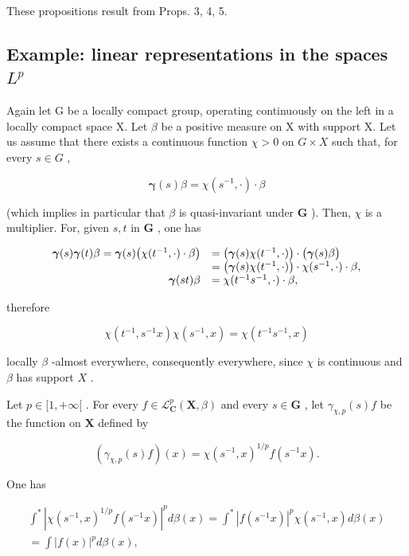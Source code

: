 These propositions result from Props. 3, 4, 5.

\subsection{\texorpdfstring{Example: linear representations in the spaces \(L^{p}\)}{Example: linear representations in the spaces L\^{}\{p\}}}

Again let G be a locally compact group, operating continuously on the left in a locally compact space X. Let \(\beta\) be a positive measure on X with support X. Let us assume that there exists a continuous function \(\chi > 0\) on \(G \times X\) such that, for every \(s \in G\) ,

\[
\boldsymbol {\gamma} (s) \beta = \chi (s ^ {- 1}, \cdot) \cdot \beta
\]

(which implies in particular that \(\beta\) is quasi-invariant under \(\mathbf{G}\) ). Then, \(\chi\) is a multiplier. For, given \(s, t\) in \(\mathbf{G}\) , one has

\[
\begin{array}{r l} \boldsymbol {\gamma} (s) \boldsymbol {\gamma} (t) \beta = \boldsymbol {\gamma} (s) \big (\chi (t ^ {- 1}, \cdot) \cdot \beta \big) & = \big (\boldsymbol {\gamma} (s) \chi (t ^ {- 1}, \cdot) \big) \cdot \big (\boldsymbol {\gamma} (s) \beta \big) \\ & = \big (\boldsymbol {\gamma} (s) \chi (t ^ {- 1}, \cdot) \big) \cdot \chi (s ^ {- 1}, \cdot) \cdot \beta , \\ \boldsymbol {\gamma} (s t) \beta & = \chi (t ^ {- 1} s ^ {- 1}, \cdot) \cdot \beta , \end{array}
\]

therefore

\[
\chi (t ^ {- 1}, s ^ {- 1} x) \chi (s ^ {- 1}, x) = \chi (t ^ {- 1} s ^ {- 1}, x)
\]

locally \(\beta\) -almost everywhere, consequently everywhere, since \(\chi\) is continuous and \(\beta\) has support \(X\) .

Let \(p \in [1, +\infty[\) . For every \(f \in \mathcal{L}_{\mathbf{C}}^{p}(\mathbf{X}, \beta)\) and every \(s \in \mathbf{G}\) , let \(\gamma_{\chi,p}(s)f\) be the function on \(\mathbf{X}\) defined by

\[
\left(\gamma_ {\chi , p} (s) f\right) (x) = \chi (s ^ {- 1}, x) ^ {1 / p} f (s ^ {- 1} x).
\]

One has

\[
\begin{array}{c} \int^ {*} | \chi (s ^ {- 1}, x) ^ {1 / p} f (s ^ {- 1} x) | ^ {p} d \beta (x) = \int^ {*} | f (s ^ {- 1} x) | ^ {p} \chi (s ^ {- 1}, x) d \beta (x) \\ = \int | f (x) | ^ {p} d \beta (x), \end{array}
\]


